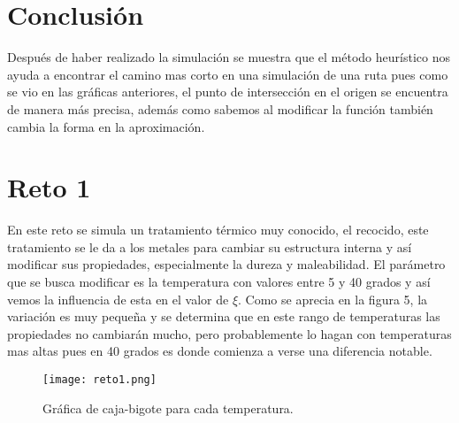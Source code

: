 \documentclass{article}
\begin{document}
\newpage
\section{Conclusi\'on}

Despu\'es de haber realizado la simulaci\'on se muestra que el m\'etodo heur\'istico nos ayuda a encontrar el camino mas corto en una simulaci\'on de una ruta pues como se vio en las gr\'aficas anteriores, el punto de intersecci\'on en el origen se encuentra de manera m\'as precisa, adem\'as como sabemos al modificar la funci\'on tambi\'en cambia la forma en la aproximaci\'on. 

\section{Reto 1}
En este reto se simula un tratamiento t\'ermico muy conocido, el recocido, este tratamiento se le da a los metales para cambiar su estructura interna y as\'i modificar sus propiedades, especialmente la dureza y maleabilidad. El par\'ametro que se busca modificar es la temperatura con valores entre 5 y 40 grados y as\'i vemos la influencia de esta en el valor de $\xi$. Como se aprecia en la figura 5, la variaci\'on es muy peque\~na y se determina que en este rango de temperaturas las propiedades no cambiar\'an mucho, pero probablemente lo hagan con temperaturas mas altas pues en 40 grados es donde comienza a verse una diferencia notable.
\begin{figure}
  \centering\texttt{[image: reto1.png]}
  \caption{Gr\'afica de caja-bigote para cada temperatura.}
  \label{fig}
\end{figure}
\newpage


\end{document}
